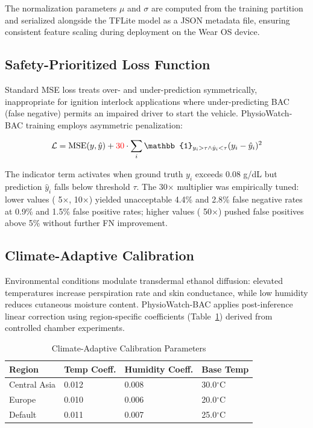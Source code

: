 \documentclass[HARVARD,Times2COL]{WileyNJDv5} %
\providecommand{\DIFadd}[1]{{\protect\color{red} #1}} %
\providecommand{\DIFdel}[1]{} %
\providecommand{\DIFaddbegin}{} %
\providecommand{\DIFaddend}{} %
\providecommand{\DIFdelbegin}{} %
\providecommand{\DIFdelend}{} %
\providecommand{\DIFscaledelfig}{0.5}
\newlength{\DIFdelgraphicswidth} %
\newlength{\DIFdelgraphicsheight} %
\providecommand{\DIFaddincludegraphics}[2][]{{\color{blue}\fbox{\DIFOincludegraphics[#1]{#2}}}} %
\providecommand{\DIFdelincludegraphics}[2][]{%
\sbox{\DIFdelgraphicsbox}{\DIFOincludegraphics[#1]{#2}}%
\settoboxwidth{\DIFdelgraphicswidth}{\DIFdelgraphicsbox} %
\settoboxtotalheight{\DIFdelgraphicsheight}{\DIFdelgraphicsbox} %
\scalebox{\DIFscaledelfig}{%
\parbox[b]{\DIFdelgraphicswidth}{\usebox{\DIFdelgraphicsbox}\\[-\baselineskip] \rule{\DIFdelgraphicswidth}{0em}}\llap{\resizebox{\DIFdelgraphicswidth}{\DIFdelgraphicsheight}{%
\setlength{\unitlength}{\DIFdelgraphicswidth}%
\begin{picture}(1,1)%
\thicklines\linethickness{2pt} %
{\color[rgb]{1,0,0}\put(0,0){\framebox(1,1){}}}%
{\color[rgb]{1,0,0}\put(0,0){\line( 1,1){1}}}%
{\color[rgb]{1,0,0}\put(0,1){\line(1,-1){1}}}%
\end{picture}%
}\hspace*{3pt}}} %
} %
\DeclareRobustCommand{\DIFaddbegin}{\DIFOaddbegin \let\includegraphics\DIFaddincludegraphics} %
\DeclareRobustCommand{\DIFaddend}{\DIFOaddend \let\includegraphics\DIFOincludegraphics} %
\DeclareRobustCommand{\DIFdelbegin}{\DIFOdelbegin \let\includegraphics\DIFdelincludegraphics} %
\DeclareRobustCommand{\DIFdelend}{\DIFOaddend \let\includegraphics\DIFOincludegraphics} %
\begin{document}
\DIFadd{The normalization parameters $\mu$ and $\sigma$ are computed from the training partition and serialized alongside the TFLite model as a JSON metadata file, ensuring consistent feature scaling during deployment on the Wear OS device.
}

\DIFaddend \subsection{Safety-Prioritized Loss Function}
Standard MSE loss treats over- and under-prediction symmetrically, inappropriate for ignition interlock applications where under-predicting BAC (false negative) permits an impaired driver to start the vehicle. PhysioWatch-BAC training employs asymmetric penalization:

\begin{equation}
\mathcal{L} = \text{MSE}(y, \hat{y}) + \DIFdelbegin \DIFdel{5 }\DIFdelend \DIFaddbegin \DIFadd{30 }\DIFaddend \cdot \sum_{i} \mathbb{1}_{y_i > \tau \land \hat{y}_i < \tau} (y_i - \hat{y}_i)^2
\end{equation}

The indicator term activates when ground truth $y_i$ exceeds 0.08 g/dL but prediction $\hat{y}_i$ falls below threshold $\tau$. The \DIFdelbegin \DIFdel{5x }\DIFdelend \DIFaddbegin \DIFadd{30$\times$ }\DIFaddend multiplier was empirically tuned: lower values (\DIFdelbegin \DIFdel{2x, 3x}\DIFdelend \DIFaddbegin \DIFadd{5$\times$, 10$\times$}\DIFaddend ) yielded unacceptable \DIFdelbegin \DIFdel{1.8\% and 1.2}\DIFdelend \DIFaddbegin \DIFadd{4.4\% and 2.8}\DIFaddend \% false negative rates \DIFaddbegin \DIFadd{at 0.9\% and 1.5\% false positive rates}\DIFaddend ; higher values (\DIFdelbegin \DIFdel{7x, 10x}\DIFdelend \DIFaddbegin \DIFadd{50$\times$}\DIFaddend ) pushed false positives above \DIFdelbegin \DIFdel{8}\DIFdelend \DIFaddbegin \DIFadd{5}\DIFaddend \% without further FN improvement.
\subsection{Climate-Adaptive Calibration}
Environmental conditions modulate transdermal ethanol diffusion: elevated temperatures increase perspiration rate and skin conductance, while low humidity reduces cutaneous moisture content. PhysioWatch-BAC applies post-inference linear correction using region-specific coefficients (Table~\ref{tab:climate}) derived from controlled chamber experiments.
\begin{table}[htbp]
\caption{Climate-Adaptive Calibration Parameters}
\label{tab:climate}
\centering
\small
\begin{tabular}{@{}llll@{}}
\toprule
\textbf{Region} & \textbf{Temp Coeff.} & \textbf{Humidity Coeff.} & \textbf{Base Temp} \\
\midrule
Central Asia & 0.012 & 0.008 & 30.0$^\circ$C \\
Europe & 0.010 & 0.006 & 20.0$^\circ$C \\
Default & 0.011 & 0.007 & 25.0$^\circ$C \\
\bottomrule
\end{tabular}
\end{table}
\end{document}
